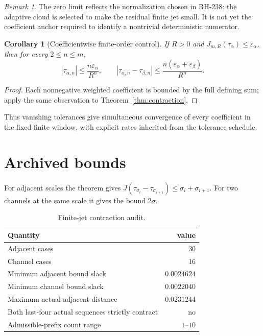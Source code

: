 \documentclass[11pt]{article}
\newtheorem{corollary}[theorem]{Corollary}
\theoremstyle{remark}
\newtheorem{remark}[theorem]{Remark}
\begin{document}
\begin{remark}
The zero limit reflects the normalization chosen in RH-238: the adaptive
cloud is selected to make the residual finite jet small.  It is not yet the
coefficient anchor required to identify a nontrivial deterministic numerator.
\end{remark}

\begin{corollary}[Coefficientwise finite-order control]\label{cor:coeff}
If $R>0$ and $J_{m,R}(\tau_\alpha)\le\varepsilon_\alpha$, then for every
$2\le n\le m$,
\[
 |\tau_{\alpha,n}|\le \frac{n\varepsilon_\alpha}{R^n},
 \qquad
 |\tau_{\alpha,n}-\tau_{\beta,n}|
 \le \frac{n(\varepsilon_\alpha+\varepsilon_\beta)}{R^n}.
\]
\end{corollary}

\begin{proof}
Each nonnegative weighted coefficient is bounded by the full defining sum;
apply the same observation to Theorem~\ref{thm:contraction}.
\end{proof}

Thus vanishing tolerances give simultaneous convergence of every coefficient
in the fixed finite window, with explicit rates inherited from the tolerance
schedule.

\section{Archived bounds}

For adjacent scales the theorem gives
$J(\tau_{\sigma_i}-\tau_{\sigma_{i+1}})\le\sigma_i+\sigma_{i+1}$.  For two
channels at the same scale it gives the bound $2\sigma$.

\begin{table}[ht]
\centering
\small
\begin{tabular}{lr}
\toprule
Quantity & value\\
\midrule
Adjacent cases & 30\\
Channel cases & 16\\
Minimum adjacent bound slack & $0.0024624$\\
Minimum channel bound slack & $0.0022040$\\
Maximum actual adjacent distance & $0.0231244$\\
Both last-four actual sequences strictly contract & no\\
Admissible-prefix count range & $1$--$10$\\
\bottomrule
\end{tabular}
\caption{Finite-jet contraction audit.}
\end{table}
\end{document}

